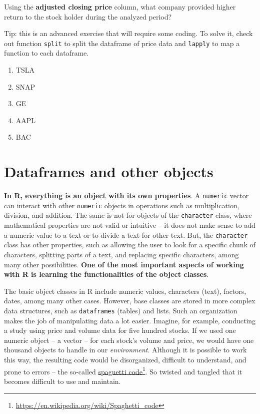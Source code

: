 \documentclass[
  12pt,
]{book}
\providecommand{\tightlist}{%
  \setlength{\itemsep}{0pt}\setlength{\parskip}{0pt}}
\begin{document}
Using the \textbf{adjusted closing price} column, what company provided higher return to the stock holder during the analyzed period?

Tip: this is an advanced exercise that will require some coding. To solve it, check out function \texttt{split} to split the dataframe of price data and \texttt{lapply} to map a function to each dataframe.

\begin{enumerate}
\def\labelenumi{\alph{enumi})}
\tightlist
\item
  TSLA
\item
  SNAP
\item
  GE
\item
  AAPL
\item
  BAC
\end{enumerate}

\hypertarget{data-structure-objects}{%
\chapter{Dataframes and other objects}\label{data-structure-objects}}

\textbf{In R, everything is an object with its own properties}. A \texttt{numeric} vector can interact with other \texttt{numeric} objects in operations such as multiplication, division, and addition. The same is not for objects of the \texttt{character} class, where mathematical properties are not valid or intuitive -- it does not make sense to add a numeric value to a text or to divide a text for other text. But, the \texttt{character} class has other properties, such as allowing the user to look for a specific chunk of characters, splitting parts of a text, and replacing specific characters, among many other possibilities. \textbf{One of the most important aspects of working with R is learning the functionalities of the object classes}.

The basic object classes in R include numeric values, characters (text), factors, dates, among many other cases. However, base classes are stored in more complex data structures, such as \texttt{dataframes} (tables) and lists. Such an organization makes the job of manipulating data a lot easier. Imagine, for example, conducting a study using price and volume data for five hundred stocks. If we used one numeric object -- a vector -- for each stock's volume and price, we would have one thousand objects to handle in our \emph{environment}. Although it is possible to work this way, the resulting code would be disorganized, difficult to understand, and prone to errors -- the so-called \href{https://en.wikipedia.org/wiki/Spaghetti_code}{spaguetti code}\footnote{\url{https://en.wikipedia.org/wiki/Spaghetti_code}}. So twisted and tangled that it becomes difficult to use and maintain.
\end{document}
